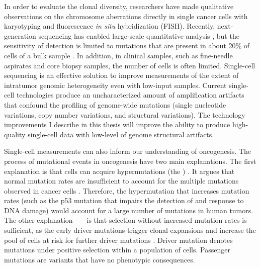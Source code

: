 In order to evaluate the clonal diversity, researchers have made qualitative observations on the chromosome aberrations directly in single cancer cells with karyotyping and fluorescence \textit{in situ} hybridization (FISH). Recently, next-generation sequencing has enabled large-scale quantitative analysis \cite{Navin:2014cm}, but the sensitivity of detection is limited to mutations that are present in about 20\% of cells of a bulk sample \cite{Gawad:2016vx}. In addition, in clinical samples, such as fine-needle aspirates and core biopsy samples, the number of cells is often limited. Single-cell sequencing is an effective solution to improve measurements of the extent of intratumor genomic heterogeneity even with low-input samples. Current single-cell technologies produce an uncharacterized amount of amplification artifacts that confound the profiling of genome-wide mutations (single nucleotide variations, copy number variations, and structural variations). The technology improvements I describe in this thesis will improve the ability to produce high-quality single-cell data with low-level of genome structural artifacts. 

Single-cell measurements can also inform our understanding of oncogenesis. The process of mutational events in oncogenesis have two main explanations. The first explanation is that cells can acquire hypermutations (the ) \cite{Loeb:2003ij}. It argues that normal mutation rates are insufficient to account for the multiple mutations observed in cancer cells \cite{Loeb:1991us}. Therefore, the hypermutation that increases mutation rates (such as the p53 mutation that impairs the detection of and response to DNA damage) would account for a large number of mutations in human tumors. The other explanation --  -- is that selection without increased mutation rates is sufficient, as the early driver mutations trigger clonal expansions and increase the pool of cells at risk for further driver mutations \cite{Tomlinson:1996vw}. Driver mutation denotes mutations under positive selection within a population of cells. Passenger mutations are variants that have no phenotypic consequences. 

